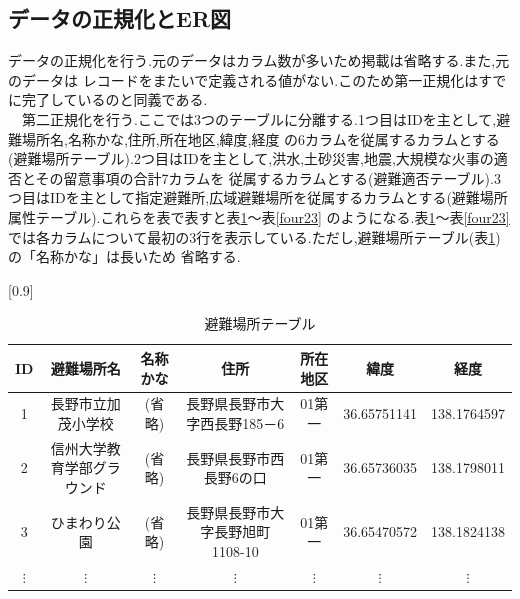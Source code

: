 \documentclass[a4j]{jarticle}
\begin{document}
    \subsection{データの正規化とER図}
    データの正規化を行う.元のデータはカラム数が多いため掲載は省略する.また,元のデータは
    レコードをまたいで定義される値がない.このため第一正規化はすでに完了しているのと同義である.\\
    　第二正規化を行う.ここでは3つのテーブルに分離する.1つ目はIDを主として,避難場所名,名称かな,住所,所在地区,緯度,経度
    の6カラムを従属するカラムとする(避難場所テーブル).2つ目はIDを主として,洪水,土砂災害,地震,大規模な火事の適否とその留意事項の合計7カラムを
    従属するカラムとする(避難適否テーブル).3つ目はIDを主として指定避難所,広域避難場所を従属するカラムとする(避難場所属性テーブル).これらを表で表すと表\ref{four21}～表\ref{four23}
    のようになる.表\ref{four21}～表\ref{four23}では各カラムについて最初の3行を表示している.ただし,避難場所テーブル(表\ref{four21})の「名称かな」は長いため
    省略する.
    \begin{table}[H]
      \caption{避難場所テーブル}
      \label{four21}
      \begin{center}
        \scalebox{0.7}[0.9]{
          \begin{tabular}{c|c|c|c|c|c|c}\hline
            ID & 避難場所名 & 名称かな & 住所 & 所在地区 & 緯度 & 経度 \\ \hline \hline
            1 & 長野市立加茂小学校 & (省略) & 長野県長野市大字西長野185－6 & 01第一 & 36.65751141 & 138.1764597 \\ \hline
            2 & 信州大学教育学部グラウンド & (省略) & 長野県長野市西長野6の口 & 01第一 & 36.65736035 & 138.1798011 \\ \hline
            3 & ひまわり公園 & (省略) & 長野県長野市大字長野旭町1108-10 & 01第一 & 36.65470572 & 138.1824138 \\ \hline
            $\vdots$ & $\vdots$ & $\vdots$ & $\vdots$ & $\vdots$ & $\vdots$ & $\vdots$\\ \hline
          \end{tabular}
        }
      \end{center}
      \end{table}
\end{document}
